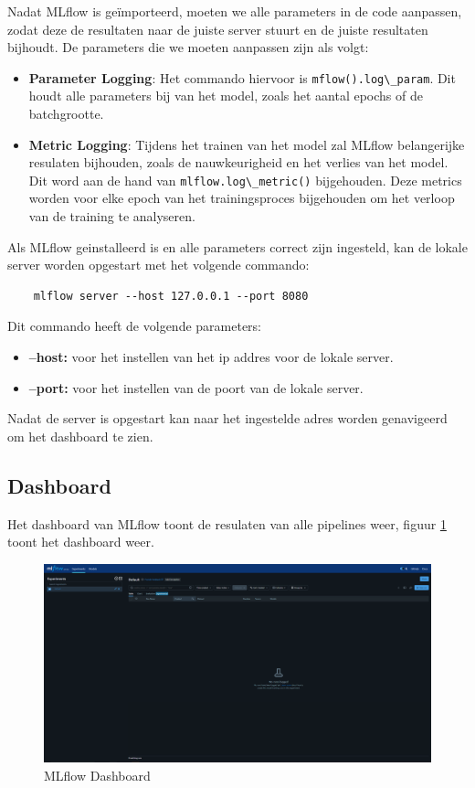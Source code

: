 Nadat MLflow is geïmporteerd, moeten we alle parameters in de code aanpassen, zodat deze de resultaten naar de juiste server stuurt en de juiste resultaten bijhoudt. De parameters die we moeten aanpassen zijn als volgt:
\begin{itemize}
    \item \textbf{Parameter Logging}: Het commando hiervoor is \verb+mflow().log\_param+. Dit houdt alle parameters bij van het model, zoals het aantal epochs of de batchgrootte.
    \item \textbf{Metric Logging}: Tijdens het trainen van het model zal MLflow belangerijke resulaten bijhouden, zoals de nauwkeurigheid en het verlies van het model. Dit word aan de hand van \verb+mlflow.log\_metric()+ bijgehouden. Deze metrics worden voor elke epoch van het trainingsproces bijgehouden om het verloop van de training te analyseren.
\end{itemize}
Als MLflow geinstalleerd is en alle parameters correct zijn ingesteld, kan de lokale server worden opgestart met het volgende commando:
\begin{verbatim}
    mlflow server --host 127.0.0.1 --port 8080
\end{verbatim}
Dit commando heeft de volgende parameters:
\begin{itemize}
    \item \textbf{--host:} voor het instellen van het ip addres voor de lokale server.
    \item \textbf{--port:} voor het instellen van de poort van de lokale server.
\end{itemize}
Nadat de server is opgestart kan naar het ingestelde adres worden genavigeerd om het dashboard te zien.
\subsection{Dashboard}
Het dashboard van MLflow toont de resulaten van alle pipelines weer, figuur \ref{fig:mlflow_dashboard} toont het dashboard weer.
\begin{figure}[htbp]
    \centering
    \includegraphics[width=0.9\linewidth]{graphics/mlflow_dashboard.PNG}
    \caption{MLflow Dashboard}
    \label{fig:mlflow_dashboard}
\end{figure}

